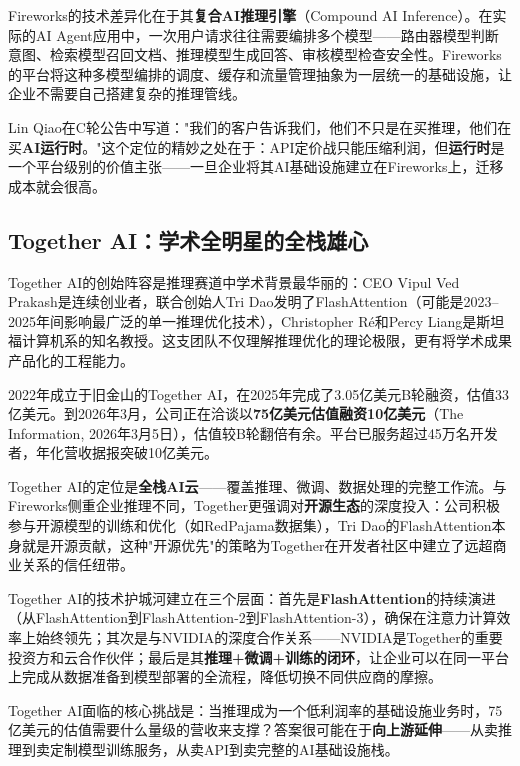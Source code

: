 Fireworks的技术差异化在于其\textbf{复合AI推理引擎}（Compound AI Inference）。在实际的AI Agent应用中，一次用户请求往往需要编排多个模型——路由器模型判断意图、检索模型召回文档、推理模型生成回答、审核模型检查安全性。Fireworks的平台将这种多模型编排的调度、缓存和流量管理抽象为一层统一的基础设施，让企业不需要自己搭建复杂的推理管线。

Lin Qiao在C轮公告中写道："我们的客户告诉我们，他们不只是在买推理，他们在买\textbf{AI运行时}。"这个定位的精妙之处在于：API定价战只能压缩利润，但\textbf{运行时}是一个平台级别的价值主张——一旦企业将其AI基础设施建立在Fireworks上，迁移成本就会很高。

\subsection{Together AI：学术全明星的全栈雄心}
\label{subsec:together-inference}

Together AI的创始阵容是推理赛道中学术背景最华丽的：CEO Vipul Ved Prakash是连续创业者，联合创始人Tri Dao发明了FlashAttention（可能是2023--2025年间影响最广泛的单一推理优化技术），Christopher Ré和Percy Liang是斯坦福计算机系的知名教授。这支团队不仅理解推理优化的理论极限，更有将学术成果产品化的工程能力。

2022年成立于旧金山的Together AI，在2025年完成了3.05亿美元B轮融资，估值33亿美元。到2026年3月，公司正在洽谈以\textbf{75亿美元估值融资10亿美元}（The Information, 2026年3月5日），估值较B轮翻倍有余。平台已服务超过45万名开发者，年化营收据报突破10亿美元。

Together AI的定位是\textbf{全栈AI云}——覆盖推理、微调、数据处理的完整工作流。与Fireworks侧重企业推理不同，Together更强调对\textbf{开源生态}的深度投入：公司积极参与开源模型的训练和优化（如RedPajama数据集），Tri Dao的FlashAttention本身就是开源贡献，这种"开源优先"的策略为Together在开发者社区中建立了远超商业关系的信任纽带。

Together AI的技术护城河建立在三个层面：首先是\textbf{FlashAttention}的持续演进（从FlashAttention到FlashAttention-2到FlashAttention-3），确保在注意力计算效率上始终领先；其次是与NVIDIA的深度合作关系——NVIDIA是Together的重要投资方和云合作伙伴；最后是其\textbf{推理+微调+训练的闭环}，让企业可以在同一平台上完成从数据准备到模型部署的全流程，降低切换不同供应商的摩擦。

Together AI面临的核心挑战是：当推理成为一个低利润率的基础设施业务时，75亿美元的估值需要什么量级的营收来支撑？答案很可能在于\textbf{向上游延伸}——从卖推理到卖定制模型训练服务，从卖API到卖完整的AI基础设施栈。

